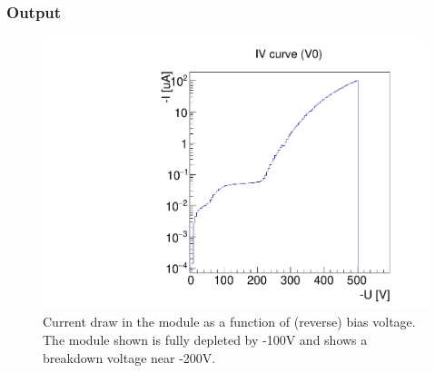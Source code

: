 \subsubsection{Output}

\begin{figure}[!Hp]
\centering
\begin{minipage}{0.45\textwidth}
  \includegraphics[width=1.0\textwidth]{figures/iv_IVcurve.pdf}
  \caption{Current draw in the module as a function of (reverse) bias voltage.
The module shown is fully depleted by -100V and shows a breakdown voltage near -200V.}
  \label{fig:iv_IVcurve}
\end{minipage}
\end{figure}
